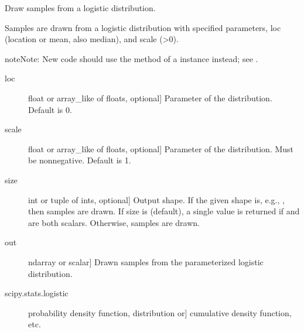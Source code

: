\documentclass[letterpaper,10pt,english]{sphinxmanual}
\begin{document}
\begin{fulllineitems}
\label{\detokenize{infrapy.utils:infrapy.utils.ref2sac.logistic}}
Draw samples from a logistic distribution.

Samples are drawn from a logistic distribution with specified
parameters, loc (location or mean, also median), and scale (\textgreater{}0).

\begin{sphinxadmonition}{note}{Note:}
New code should use the  method of a 
instance instead; see .
\end{sphinxadmonition}
\begin{description}
\item[{loc}] \leavevmode{[}float or array\_like of floats, optional{]}
Parameter of the distribution. Default is 0.

\item[{scale}] \leavevmode{[}float or array\_like of floats, optional{]}
Parameter of the distribution. Must be non\sphinxhyphen{}negative.
Default is 1.

\item[{size}] \leavevmode{[}int or tuple of ints, optional{]}
Output shape.  If the given shape is, e.g., , then
 samples are drawn.  If size is  (default),
a single value is returned if  and  are both scalars.
Otherwise,  samples are drawn.

\end{description}
\begin{description}
\item[{out}] \leavevmode{[}ndarray or scalar{]}
Drawn samples from the parameterized logistic distribution.

\end{description}
\begin{description}
\item[{scipy.stats.logistic}] \leavevmode{[}probability density function, distribution or{]}
cumulative density function, etc.


\end{description}
\end{fulllineitems}
\end{document}
